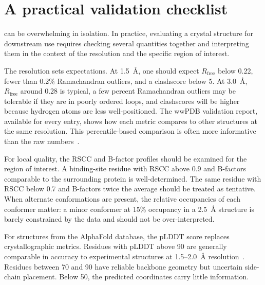 \section{A practical validation checklist}
\label{sec:checklist}

 can be overwhelming in
isolation. In practice, evaluating a crystal structure for downstream
use requires checking several quantities together and interpreting
them in the context of the resolution and the specific region of
interest.

The resolution sets expectations. At 1.5~{\AA}, one should expect
$R_{\mathrm{free}}$ below 0.22, fewer than 0.2\% Ramachandran outliers,
and a clashscore below 5. At 3.0~{\AA}, $R_{\mathrm{free}}$ around
0.28 is typical, a few percent Ramachandran outliers may be tolerable
if they are in poorly ordered loops, and clashscores will be higher
because hydrogen atoms are less well-positioned. The wwPDB validation
report, available for every entry, shows how each metric compares to
other structures at the same resolution. This percentile-based
comparison is often more informative than the raw numbers~\cite{gore2017}.

For local quality, the RSCC and B-factor profiles should be examined
for the region of interest. A binding-site residue with RSCC above
0.9 and B-factors comparable to the surrounding protein is
well-determined. The same residue with RSCC below 0.7 and B-factors
twice the average should be treated as tentative. When alternate
conformations are present, the relative occupancies of each conformer
matter: a minor conformer at 15\% occupancy in a 2.5~{\AA} structure
is barely constrained by the data and should not be over-interpreted.

For structures from the AlphaFold database, the pLDDT score replaces
crystallographic metrics. Residues with pLDDT above 90 are generally
comparable in accuracy to experimental structures at 1.5--2.0~{\AA}
resolution~\cite{senior2020}.
Residues between 70 and 90 have reliable backbone geometry but
uncertain side-chain placement. Below 50, the predicted coordinates
carry little information.


